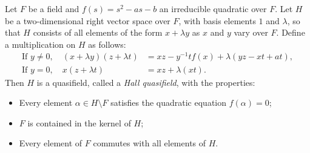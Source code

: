 Let $F$ be a field and $f(s) = s^2 - as - b$ an irreducible quadratic over $F$. Let $H$ be a two-dimensional right vector space over $F$, with basis elements $1$ and $\lambda$, so that $H$ consists of all elements of the form $x + \lambda y$ as $x$ and $y$ vary over $F$. Define a multiplication on $H$ as follows:
$$
\begin{aligned}
\text{If } y \neq 0, \quad (x + \lambda y)(z + \lambda t) &= xz - y^{-1}t f(x) + \lambda(yz - xt + at), \\
\text{If } y = 0, \quad x(z + \lambda t) &= xz + \lambda(xt).
\end{aligned}
$$
Then $H$ is a quasifield, called a \emph{Hall quasifield}, with the properties:
\begin{itemize}
\item Every element $\alpha \in H \setminus F$ satisfies the quadratic equation $f(\alpha) = 0$;
\item $F$ is contained in the kernel of $H$;
\item Every element of $F$ commutes with all elements of $H$.
\end{itemize}